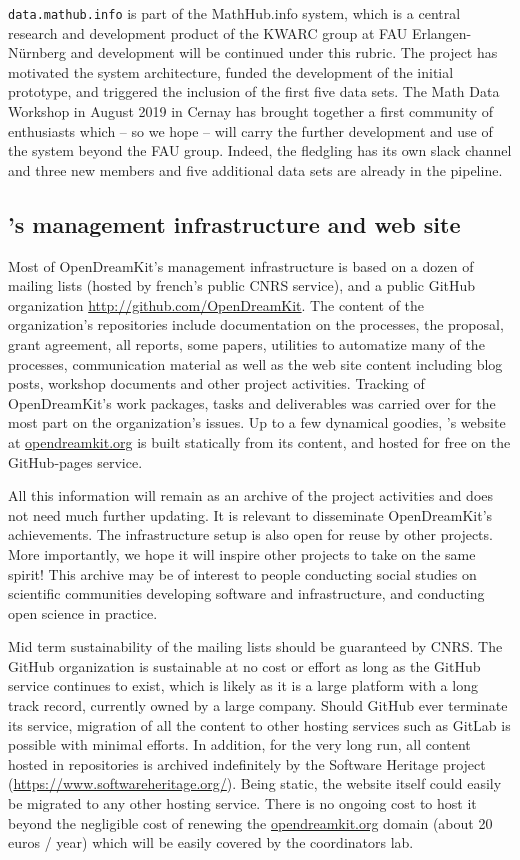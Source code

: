 \documentclass{deliverablereport}
\def\dmh{\texttt{data.mathub.info}\xspace}
\begin{document}
\dmh is part of the MathHub.info system, which is a central research and development
product of the KWARC group at FAU Erlangen-N\"urnberg and development will be continued
under this rubric.
The \pn project has motivated the system architecture, funded the development of the
initial prototype, and triggered the inclusion of the first five data sets.
The Math Data Workshop in August 2019 in Cernay has brought together a first community of
enthusiasts which -- so we hope -- will carry the further development and use of the system
beyond the FAU group.
Indeed, the fledgling has its own slack channel and three new members and five additional
data sets are already in the pipeline.

\subsection{\ODK's management infrastructure and web site}

Most of OpenDreamKit's management infrastructure is based on a dozen
of mailing lists (hosted by french's public CNRS service), and a
public GitHub organization \url{http://github.com/OpenDreamKit}. The
content of the organization's repositories include documentation on
the processes, the proposal, grant agreement, all reports, some
papers, utilities to automatize many of the processes, communication
material as well as the web site content including blog posts,
workshop documents and other project activities. Tracking of
OpenDreamKit's work packages, tasks and deliverables was carried over
for the most part on the organization's issues. Up to a few dynamical
goodies, \ODK's website at \url{opendreamkit.org} is built statically
from its content, and hosted for free on the GitHub-pages service.

All this information will remain as an archive of the project
activities and does not need much further updating. It is relevant to
disseminate OpenDreamKit's achievements. The infrastructure setup is
also open for reuse by other projects. More importantly, we hope it
will inspire other projects to take on the same spirit! This archive
may be of interest to people conducting social studies on scientific
communities developing software and infrastructure, and conducting
open science in practice.

Mid term sustainability of the mailing lists should be guaranteed by
CNRS. The GitHub organization is sustainable at no cost or effort as
long as the GitHub service continues to exist, which is likely as it
is a large platform with a long track record, currently owned by a
large company. Should GitHub ever terminate its service, migration of
all the content to other hosting services such as GitLab is possible
with minimal efforts. In addition, for the very long run, all content
hosted in repositories is archived indefinitely by the Software
Heritage project (\url{https://www.softwareheritage.org/}). Being
static, the website itself could easily be migrated to any other
hosting service. There is no ongoing cost to host it beyond the
negligible cost of renewing the \url{opendreamkit.org} domain (about
20 euros / year) which will be easily covered by the coordinators lab.
\end{document}
